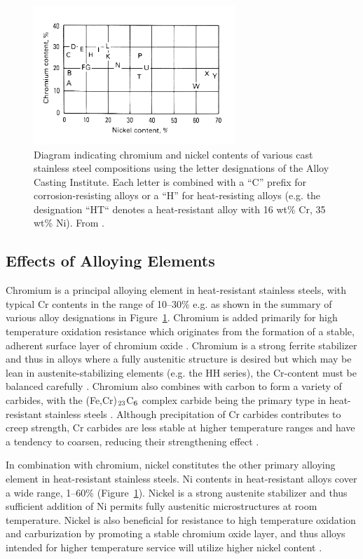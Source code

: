 \begin{figure}
\centering
\includegraphics[width=3in]{figures/aci-designation.png}
\caption{Diagram indicating chromium and nickel contents of various cast stainless steel compositions using the letter designations of the Alloy Casting Institute. Each letter is combined with a “C” prefix for corrosion-resisting alloys or a “H” for heat-resisting alloys (e.g. the designation “HT“ denotes a heat-resistant alloy with 16 wt\% Cr, 35 wt\% Ni). From \citet{blair_cast_stainless_1990}.}
\label{fig:aci-alloy-designations}
\end{figure}

\subsection{Effects of Alloying Elements}
Chromium is a principal alloying element in heat-resistant stainless steels, with typical Cr contents in the range of \numrange[range-phrase=--]{10}{30}\% e.g. as shown in the summary of various alloy designations in Figure~\ref{fig:aci-alloy-designations}. Chromium is added primarily for high temperature oxidation resistance which originates from the formation of a stable, adherent surface layer of chromium oxide \cite{kane_evolution_1991}. Chromium is a strong ferrite stabilizer \cite{folkhard_welding_1988} and thus in alloys where a fully austenitic structure is desired but which may be lean in austenite-stabilizing elements (e.g. the HH series), the Cr-content must be balanced carefully \cite{avery_cast_1969}. Chromium also combines with carbon to form a variety of carbides, with the (Fe,Cr)$_\textnormal{23}$C$_\textnormal{6}$ complex carbide being the primary type in heat-resistant stainless steels \cite{sourmail_precipitation_2001}. Although precipitation of Cr carbides contributes to creep strength, Cr carbides are less stable at higher temperature ranges and have a tendency to coarsen, reducing their strengthening effect \cite{avery_cast_1969}.

In combination with chromium, nickel constitutes the other primary alloying element in heat-resistant stainless steels. Ni contents in heat-resistant alloys cover a wide range, \numrange[range-phrase=--]{1}{60}\% (Figure~\ref{fig:aci-alloy-designations}). Nickel is a strong austenite stabilizer \cite{folkhard_welding_1988} and thus sufficient addition of Ni permits fully austenitic microstructures at room temperature. Nickel is also beneficial for resistance to high temperature oxidation and carburization by promoting a stable chromium oxide layer, and thus alloys intended for higher temperature service will utilize higher nickel content \cite{kane_evolution_1991}.

